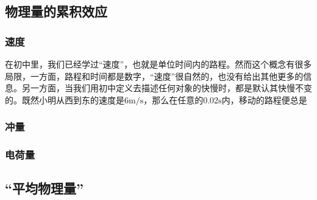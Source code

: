 
\subsection{物理量的累积效应}
\subsubsection{速度}
在初中里，我们已经学过“速度”，也就是单位时间内的路程。然而这个概念有很多局限，一方面，路程和时间都是数字，“速度”很自然的，也没有给出其他更多的信息。另一方面，当我们用初中定义去描述任何对象的快慢时，都是默认其快慢不变的。既然小明从西到东的速度是$6 \mathrm{m/s}$，那么在任意的$0.02\mathrm s$内，移动的路程便总是
\subsubsection{冲量}
\subsubsection{电荷量}
\subsection{“平均物理量”}